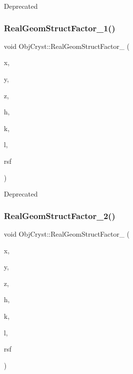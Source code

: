 \begin{DoxyRefDesc}{Deprecated}
\item[\mbox{\hyperlink{deprecated__deprecated000002}{Deprecated}}]\end{DoxyRefDesc}
\mbox{\label{namespace_obj_cryst_acba26788bc095d3f25b8583191e3cef6}} 
\subsubsection{\texorpdfstring{RealGeomStructFactor\_1()}{RealGeomStructFactor\_1()}}
{\footnotesize\ttfamily void Obj\+Cryst\+::\+Real\+Geom\+Struct\+Factor\+\_ (\begin{DoxyParamCaption}\item[{const R\+E\+AL}]{x,  }\item[{const R\+E\+AL}]{y,  }\item[{const R\+E\+AL}]{z,  }\item[{const Cryst\+Vector\+\_\+\+R\+E\+AL \&}]{h,  }\item[{const Cryst\+Vector\+\_\+\+R\+E\+AL \&}]{k,  }\item[{const Cryst\+Vector\+\_\+\+R\+E\+AL \&}]{l,  }\item[{Cryst\+Vector\+\_\+\+R\+E\+AL \&}]{rsf }\end{DoxyParamCaption})}

\begin{DoxyRefDesc}{Deprecated}
\item[\mbox{\hyperlink{deprecated__deprecated000004}{Deprecated}}]\end{DoxyRefDesc}
\mbox{\label{namespace_obj_cryst_aab08fdfd88756fd3658b5aac00d56b71}} 
\subsubsection{\texorpdfstring{RealGeomStructFactor\_2()}{RealGeomStructFactor\_2()}}
{\footnotesize\ttfamily void Obj\+Cryst\+::\+Real\+Geom\+Struct\+Factor\+\_ (\begin{DoxyParamCaption}\item[{const R\+E\+AL}]{x,  }\item[{const R\+E\+AL}]{y,  }\item[{const R\+E\+AL}]{z,  }\item[{const Cryst\+Vector\+\_\+\+R\+E\+AL \&}]{h,  }\item[{const Cryst\+Vector\+\_\+\+R\+E\+AL \&}]{k,  }\item[{const Cryst\+Vector\+\_\+\+R\+E\+AL \&}]{l,  }\item[{Cryst\+Vector\+\_\+\+R\+E\+AL \&}]{rsf }\end{DoxyParamCaption})}

